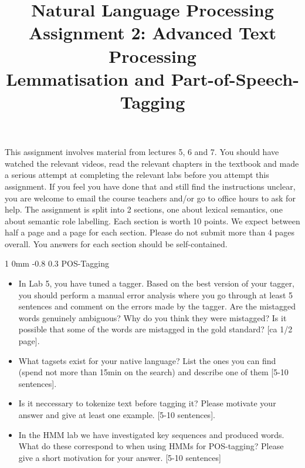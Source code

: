\documentclass[11pt]{article}
\title{{\LARGE Natural Language Processing}\\[1.5mm]{\large Assignment 2: Advanced Text Processing\\Lemmatisation and Part-of-Speech-Tagging}}
\author{}
\date{} %
\makeatletter
\newcommand{\newsec}[1]{\section{#1}\noindent}
\renewcommand{\section}{\@startsection
{section}%
{1}%
{0mm}%
{-0.8\baselineskip}%
{0.3\baselineskip}%
{\bfseries\large}}%
\makeatother
\begin{document}


\maketitle

\noindent This assignment involves material from lectures 5, 6 and
7. You should have watched the relevant videos, read the relevant
chapters in the textbook and made a serious attempt at completing the
relevant labs before you attempt this assignment. If you feel you have
done that and still find the instructions unclear, you are welcome to
email the course teachers and/or go to office hours to ask for help.
The assignment is split into 2 sections, one about lexical semantics,
one about semantic role labelling. Each section is worth 10 points. We
expect between half a page and a page for each section. Please do not
submit more than 4 pages overall.  You answers for each section should
be self-contained.

\newsec{POS-Tagging}%
\begin{itemize}
\item In Lab 5, you have tuned a tagger. Based on the best version of
  your tagger, you should perform a manual error analysis where you go
  through at least 5 sentences and comment on the errors made by the
  tagger. Are the mistagged words genuinely ambiguous? Why do you
  think they were mistagged? Is it possible that some of the words are
  mistagged in the gold standard? \textcolor{UUred}{[ca 1/2 page]}.
\item What tagsets exist for your native language? List the ones you
  can find (spend not more than 15min on the search) and describe one
  of them \textcolor{UUred}{[5-10
    sentences]}. %
\item Is it neccessary to tokenize text before tagging it? Please
  motivate your answer and give at least one
  example. \textcolor{UUred}{[5-10
    sentences]}. %
\item In the HMM lab we have investigated key sequences and produced
  words. What do these correspond to when using HMMs for POS-tagging?
  Please give a short motivation for your
  answer. \textcolor{UUred}{[5-10 sentences]}
\end{itemize}
\end{document}
